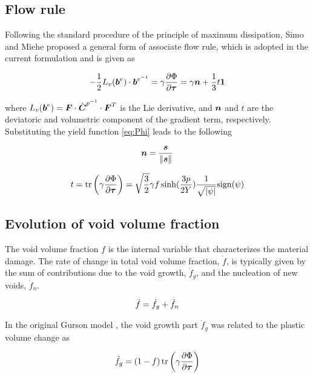 \subsection{Flow rule}
Following the standard procedure of the principle of maximum dissipation, Simo and Miehe \cite{Simo1992} proposed a general form of associate flow rule, which is adopted in the current formulation and is given as

\begin{equation}\label{eq:flowRule}
-\frac{1}{2}L_v({\boldsymbol{b}}^e)\cdot{\boldsymbol{b}}^{e^{-1}} = \gamma\frac{\partial\Phi}{\partial{\boldsymbol{\tau}}}=\gamma{\boldsymbol{n}} + \frac{1}{3}t\boldsymbol{1}
\end{equation}

where $L_v({\boldsymbol{b}}^e)={\boldsymbol{F}} \cdot \dot{{\boldsymbol{C}}}^{p^{-1}} \cdot {\boldsymbol{F}}^T$ is the Lie derivative, and ${\boldsymbol{n}}$ and $t$ are the deviatoric and volumetric component of the gradient term, respectively. Substituting the yield function \eqref{eq:Phi} leads to the following

\begin{equation}\label{eq:n}
{\boldsymbol{n}} = \frac{{\boldsymbol{s}}}{\|{\boldsymbol{s}}\|}
\end{equation}

\begin{equation}\label{eq:t}
t = \operatorname{\text{tr}} \left( \gamma \frac{\partial\Phi}{\partial{\boldsymbol{\tau}}}\right) = \sqrt{\frac{3}{2}}\gamma f \sinh (\frac{3p}{2 Y})\frac{1}{\sqrt{|\psi|}} {\rm sign}(\psi)
\end{equation}

\subsection{Evolution of void volume fraction}
The void volume fraction $f$ is the internal variable that characterizes the material damage. The rate of change in total void volume fraction, $\dot{f}$, is typically given by the sum of contributions due to the void growth, $\dot{f}_g$, and the nucleation of new voids, $\dot{f}_{n}$.

\begin{equation}\label{eq:dotf}
\dot{f} = \dot{f}_g + \dot{f}_{n}\\
\end{equation}

In the original Gurson model \cite{Gurson1977}, the void growth part $\dot{f}_g$ was related to the plastic volume change as 

\begin{equation}\label{eq:fg_orig}
\dot{f}_g = (1-f)\operatorname{\text{tr}}\left( \gamma\frac{\partial\Phi}{\partial{\boldsymbol{\tau}}} \right)
\end{equation}


